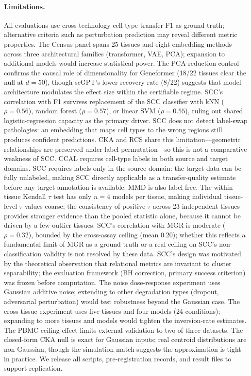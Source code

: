 \documentclass[11pt]{article}
\begin{document}
\paragraph{Limitations.} All evaluations use cross-technology cell-type
transfer F1 as ground truth; alternative criteria such as perturbation
prediction may reveal different metric properties. The Census panel
spans 25 tissues and eight embedding methods across three architectural
families (transformer, VAE, PCA); expansion to additional models would
increase statistical power. The PCA-reduction control confirms the
causal role of dimensionality for Geneformer (18/22 tissues clear the
null at $d = 50$), though scGPT's lower recovery rate (8/22) suggests
that model architecture modulates the effect size within the certifiable
regime. SCC's correlation with F1 survives replacement of the
SCC classifier with kNN ($\rho = 0.56$), random forest ($\rho = 0.57$),
or linear SVM ($\rho = 0.55$), ruling out shared logistic-regression
capacity as the primary driver. SCC does not detect label-swap pathologies: an embedding that maps cell
types to the wrong regions still produces confident predictions. CKA and
RCS share this limitation---geometric relationships are preserved under
label permutation---so this is not a comparative weakness of SCC. CCAL requires cell-type labels in both source and target
domains. SCC requires labels only in the source domain: the target
data can be fully unlabeled, making SCC directly applicable as a
transfer-quality estimate before any target annotation is available.
MMD is also label-free. The within-tissue Kendall $\tau$ test has only $n = 4$ models per
tissue, making individual tissue-level $\tau$ values coarse; the
consistency of positive $\tau$ across 23 independent tissues provides
stronger evidence than the pooled statistic alone, because it cannot
be driven by a few outlier tissues. SCC's correlation with MGR is
moderate ($\rho = 0.32$), bounded by the cross-assay ceiling (mean
0.20); whether this reflects a fundamental limit of MGR as a ground
truth or a real ceiling on SCC's non-classification validity is not
resolved by these data. SCC's design was motivated by the theoretical observation that
relational metrics are invariant to cluster separability; the
evaluation framework (BH correction, primary success criterion) was
frozen before computation. The noise dose-response experiment uses Gaussian additive
noise; extending to other degradation types (dropout, adversarial
perturbation) would test robustness beyond the Gaussian case. The
cross-tissue experiment uses five tissues and four models (24
conditions); expanding to more tissues and models would tighten the
inversion-rate estimates. The PBMC ceiling effect limits external
validation to two of three datasets. The closed-form CKA null is exact
for Gaussian inputs; real centroid distributions are non-Gaussian, though
the simulation match suggests the approximation is tight in practice. We
release all scripts, pre-registration records, and result files to
support replication.
\end{document}
